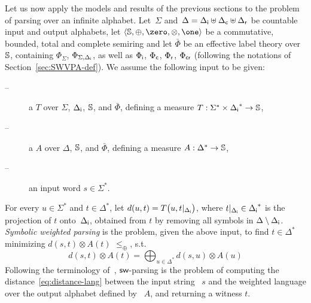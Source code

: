 Let us now apply the models and results of the previous sections %
to the problem of parsing over an infinite alphabet. %
%
%
Let~$\Sigma$
and~$\Delta = {\Delta_\mathsf{i}} \uplus {\Delta_\mathsf{c}} \uplus {\Delta_\mathsf{r}}$
be countable input and output alphabets,
let $\< \Semiring, \oplus, \zero, \otimes, \one>$ be a
commutative, bounded, total and complete %
semiring and let $\bar\Phi$ be an effective label theory over $\mathbb{S}$,
containing $\Phi_\Sigma$, $\Phi_{\Sigma, {\Delta_\mathsf{i}}}$, as well as
${\Phi_\mathsf{i}}$, ${\Phi_\mathsf{c}}$, ${\Phi_\mathsf{r}}$, ${\Phi_\mathsf{cr}}$
(following the notations of Section~\ref{sec:SWVPA-def}).
%
\noindent
We assume the following input to be given:
\begin{description}
\item[--] a \SWT $T$ over $\Sigma$, ${\Delta_\mathsf{i}}$, $\mathbb{S}$, and $\bar\Phi$,
defining a measure %
$T: \Sigma^* \times {\Delta_\mathsf{i}}^* \to \mathbb{S}$,

\item[--] a \SWVPA $A$ over $\Delta$, $\mathbb{S}$, and $\bar\Phi$,
defining a measure $A: \Delta^* \to \mathbb{S}$,
\item[--] an input word $s \in \Sigma^*$.
\end{description}
%
For every $u \in \Sigma^*$ and $t \in \Delta^*$, let
\(d(u, t) = T\bigl(u, t|_{\Delta_\mathsf{i}} \bigr)\),
where $t|_{\Delta_\mathsf{i}} \in {\Delta_\mathsf{i}}^*$ is the projection of $t$ onto~${\Delta_\mathsf{i}}$,
obtained from $t$ by removing all symbols in $\Delta \setminus {\Delta_\mathsf{i}}$.
%
\noindent
\emph{Symbolic weighted parsing} is the problem,
given the above input,
to find $t \in \Delta^*$ %
minimizing \( d(s, t) \otimes A(t)\)
\wrt $\leq_\oplus$,
\ie s.t. %
%
\begin{equation}\label{eq:distance-lang}
d(s, t) \otimes A(t) = \displaystyle\bigoplus_{u \in \Delta^*} d(s, u) \otimes A(u)
\end{equation}
%
Following the terminology of~\cite{Mohri03ijfcs},
$\textsf{sw}$-parsing is the problem of computing
the distance~\eqref{eq:distance-lang} between the input string ~$s$ and the weighted language over the output alphabet defined by ~$A$,
and returning a witness $t$.

